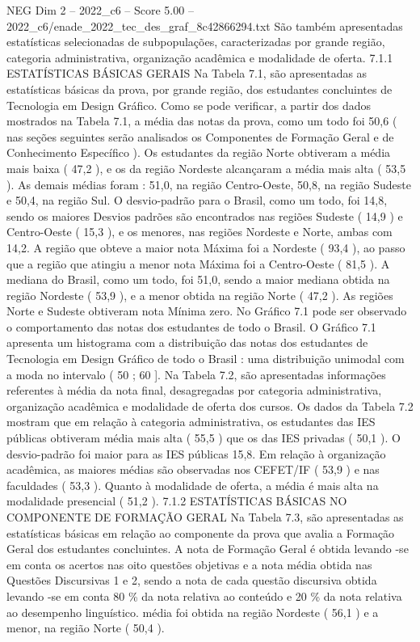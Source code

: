 \begin{textsample}{NEG Dim 2 – 2022\_c6 – Score 5.00 – 2022\_c6/enade\_2022\_tec\_des\_graf\_8c42866294.txt}
São também apresentadas estatísticas selecionadas de subpopulações, caracterizadas por grande região, categoria administrativa, organização acadêmica e modalidade de oferta. 7.1.1 ESTATÍSTICAS BÁSICAS GERAIS Na Tabela 7.1, são apresentadas as estatísticas básicas da prova, por grande região, dos estudantes concluintes de Tecnologia em Design Gráfico.
Como se pode verificar, a partir dos dados mostrados na Tabela 7.1, a média das notas da prova, como um todo foi 50,6 ( nas seções seguintes serão analisados os Componentes de Formação Geral e de Conhecimento Específico ).
Os estudantes da região Norte obtiveram a média mais baixa ( 47,2 ), e os da região Nordeste alcançaram a média mais alta ( 53,5 ).
As demais médias foram : 51,0, na região Centro-Oeste, 50,8, na região Sudeste e 50,4, na região Sul.
O desvio-padrão para o Brasil, como um todo, foi 14,8, sendo os maiores Desvios padrões são encontrados nas regiões Sudeste ( 14,9 ) e Centro-Oeste ( 15,3 ), e os menores, nas regiões Nordeste e Norte, ambas com 14,2.
A região que obteve a maior nota Máxima foi a Nordeste ( 93,4 ), ao passo que a região que atingiu a menor nota Máxima foi a Centro-Oeste ( 81,5 ).
A mediana do Brasil, como um todo, foi 51,0, sendo a maior mediana obtida na região Nordeste ( 53,9 ), e a menor obtida na região Norte ( 47,2 ).
As regiões Norte e Sudeste obtiveram nota Mínima zero.
No Gráfico 7.1 pode ser observado o comportamento das notas dos estudantes de todo o Brasil.
O Gráfico 7.1 apresenta um histograma com a distribuição das notas dos estudantes de Tecnologia em Design Gráfico de todo o Brasil : uma distribuição unimodal com a moda no intervalo ( 50 ; 60 ].
Na Tabela 7.2, são apresentadas informações referentes à média da nota final, desagregadas por categoria administrativa, organização acadêmica e modalidade de oferta dos cursos.
Os dados da Tabela 7.2 mostram que em relação à categoria administrativa, os estudantes das IES públicas obtiveram média mais alta ( 55,5 ) que os das IES privadas ( 50,1 ).
O desvio-padrão foi maior para as IES públicas 15,8.
Em relação à organização acadêmica, as maiores médias são observadas nos CEFET/IF ( 53,9 ) e nas faculdades ( 53,3 ).
Quanto à modalidade de oferta, a média é mais alta na modalidade presencial ( 51,2 ). 7.1.2 ESTATÍSTICAS BÁSICAS NO COMPONENTE DE FORMAÇÃO GERAL Na Tabela 7.3, são apresentadas as estatísticas básicas em relação ao componente da prova que avalia a Formação Geral dos estudantes concluintes.
A nota de Formação Geral é obtida levando -se em conta os acertos nas oito questões objetivas e a nota média obtida nas Questões Discursivas 1 e 2, sendo a nota de cada questão discursiva obtida levando -se em conta 80 \% da nota relativa ao conteúdo e 20 \% da nota relativa ao desempenho linguístico. média foi obtida na região Nordeste ( 56,1 ) e a menor, na região Norte ( 50,4 ).

\end{textsample}
